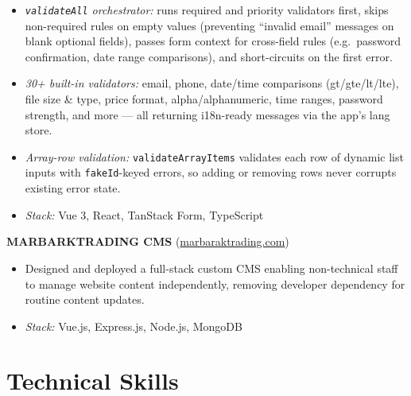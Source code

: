 \documentclass[10pt,a4paper]{article}
\begin{document}
\begin{itemize}
        TypeScript validation layer --- every rule is a plain
        \texttt{(value) => [boolean, string]} function, making the system fully composable and
        trivially extensible without learning a schema DSL.
  \item \textit{\texttt{validateAll} orchestrator:} runs required and priority validators first,
        skips non-required rules on empty values (preventing ``invalid email'' messages on blank
        optional fields), passes form context for cross-field rules (e.g.\ password confirmation,
        date range comparisons), and short-circuits on the first error.
  \item \textit{30+ built-in validators:} email, phone, date/time comparisons (gt/gte/lt/lte), file
        size \& type, price format, alpha/alphanumeric, time ranges, password strength, and more ---
        all returning i18n-ready messages via the app's lang store.
  \item \textit{Array-row validation:} \texttt{validateArrayItems} validates each row of dynamic
        list inputs with \texttt{fakeId}-keyed errors, so adding or removing rows never corrupts
        existing error state.
  \item \textit{Stack:} Vue 3, React, TanStack Form, TypeScript
\end{itemize}

\vspace{4pt}
\textbf{MARBARKTRADING CMS} (\href{https://marbaraktrading.com}{marbaraktrading.com})
\begin{itemize}
  \item Designed and deployed a full-stack custom CMS enabling non-technical staff to manage website
        content independently, removing developer dependency for routine content updates.
  \item \textit{Stack:} Vue.js, Express.js, Node.js, MongoDB
\end{itemize}

\section{Technical Skills}
\end{document}
